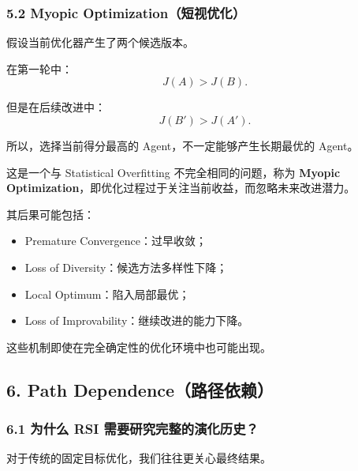 \hypertarget{part-3-37-0001-myopic-optimizationux77edux89c6ux4f18ux5316}{%
\subsubsection{5.2 Myopic Optimization（短视优化）}\label{part-3-37-0001-myopic-optimizationux77edux89c6ux4f18ux5316}}

假设当前优化器产生了两个候选版本。


在第一轮中：
\[J(A)>J(B).\]

但是在后续改进中：
\[J(B')>J(A').\]

所以，选择当前得分最高的 Agent，不一定能够产生长期最优的 Agent。

这是一个与 Statistical Overfitting 不完全相同的问题，称为 \textbf{Myopic Optimization}，即优化过程过于关注当前收益，而忽略未来改进潜力。

其后果可能包括：

\begin{itemize}
\tightlist
\item
  Premature Convergence：过早收敛；
\item
  Loss of Diversity：候选方法多样性下降；
\item
  Local Optimum：陷入局部最优；
\item
  Loss of Improvability：继续改进的能力下降。
\end{itemize}

这些机制即使在完全确定性的优化环境中也可能出现。

\hypertarget{part-3-37-0001-path-dependenceux8defux5f84ux4f9dux8d56}{%
\subsection{6. Path Dependence（路径依赖）}\label{part-3-37-0001-path-dependenceux8defux5f84ux4f9dux8d56}}

\hypertarget{part-3-37-0001-ux4e3aux4ec0ux4e48-rsi-ux9700ux8981ux7814ux7a76ux5b8cux6574ux7684ux6f14ux5316ux5386ux53f2}{%
\subsubsection{6.1 为什么 RSI 需要研究完整的演化历史？}\label{part-3-37-0001-ux4e3aux4ec0ux4e48-rsi-ux9700ux8981ux7814ux7a76ux5b8cux6574ux7684ux6f14ux5316ux5386ux53f2}}

对于传统的固定目标优化，我们往往更关心最终结果。

